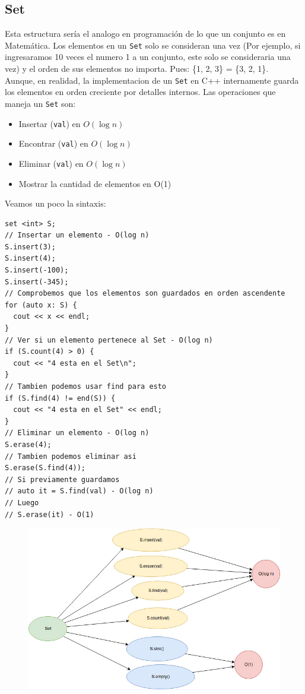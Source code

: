 \documentclass[a4paper,12pt]{article}
\begin{document}
\subsection*{Set}
Esta estructura sería el analogo en programación de lo que un conjunto es en Matemática. Los elementos en un \texttt{Set} solo se consideran una vez (Por ejemplo, si ingresaramos 10 veces el numero 1 a un conjunto, este solo se consideraria una vez) y el orden de sus elementos no importa. Pues: \{1, 2, 3\} = \{3, 2, 1\}.\\
Aunque, en realidad, la implementacion de un \texttt{Set} en C++ internamente guarda los elementos en orden creciente por detalles internos. Las operaciones que maneja un \texttt{Set} son:
\begin{itemize}
\item Insertar (\texttt{val}) en $O(\log n)$
\item Encontrar (\texttt{val}) en $O(\log n)$
\item Eliminar (\texttt{val}) en $O(\log n)$
\item Mostrar la cantidad de elementos en O(1)
\end{itemize}
Veamos un poco la sintaxis:
\begin{lstlisting}
set <int> S;
// Insertar un elemento - O(log n)
S.insert(3);
S.insert(4);
S.insert(-100);
S.insert(-345);
// Comprobemos que los elementos son guardados en orden ascendente
for (auto x: S) {
  cout << x << endl;
}
// Ver si un elemento pertenece al Set - O(log n)
if (S.count(4) > 0) {
  cout << "4 esta en el Set\n";
}
// Tambien podemos usar find para esto
if (S.find(4) != end(S)) {
  cout << "4 esta en el Set" << endl;
}
// Eliminar un elemento - O(log n)
S.erase(4);
// Tambien podemos eliminar asi
S.erase(S.find(4));
// Si previamente guardamos
// auto it = S.find(val) - O(log n)
// Luego
// S.erase(it) - O(1)
\end{lstlisting}
\begin{figure}[H]
\centering
\includegraphics[scale=0.5]{set}
\end{figure}
\end{document}
